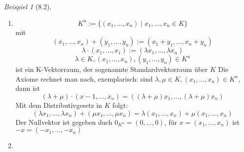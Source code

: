 \documentclass[a4paper]{scrartcl}
\theoremstyle{definition}
\theoremstyle{plain}
\theoremstyle{plain}
\theoremstyle{remark}
\theoremstyle{remark}
\theoremstyle{remark}
\newtheorem{ex}{Beispiel}
\begin{document}
\begin{ex}[8.2]
\begin{enumerate}
\item \[K^n := \{(x_1,\ldots,x_n) \mid x_1,\ldots,x_n \in K\}\]
mit
\[(x_1,\ldots,x_n) + (y_1,\ldots,y_n) := (x_1 + y_1,\ldots,x_n + y_n)\]
\[\lambda\cdot(x_1,\ldots,x_1) := (\lambda x_1,\ldots,\lambda x_n)\]
\[\lambda \in K, (x_1,\ldots,x_n),(y_1,\ldots,y_n)\in K^n\]
ist ein K-Vektorraum, der sogenannte Standardvektorraum über $K$
Die Axiome rechnet man nach, exemplarisch: sind $\lambda,\mu\in K, (x_1,\ldots,x_n)\in K^n$, dann ist
\[(\lambda + \mu) \cdot (x-1,\ldots,x_n) = ((\lambda + \mu)x_1,\ldots,(\lambda + \mu)x_n)\]
Mit dem Distributivgesetz in $K$ folgt:
\[(\lambda x_1,\ldots,\lambda x_n) + (\mu x_1,\ldots,\mu x_n) = \lambda(x_1,\ldots,x_n) + \mu(x_1,\ldots,x_n)\]
Der Nullvektor ist gegeben duch $0_{K^n} = (0,\ldots,0)$, für $x =(x_1,\ldots,x_n)$ ist $-x = (-x_1,\ldots,-x_n)$
\item 
\end{enumerate}
\end{ex}
\end{document}
